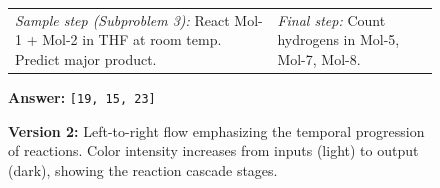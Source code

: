 \documentclass{article}
\begin{document}
\begin{figure}[t]
\begin{tcolorbox}
    \vspace{0.1cm}
    \begin{tabular}{@{}p{}p{}@{}}
    \textit{Sample step (Subproblem 3):} React Mol-1 + Mol-2 in THF at room temp. Predict major product. &
    \textit{Final step:} Count hydrogens in Mol-5, Mol-7, Mol-8. \\
    \end{tabular}

    \vspace{0.25cm}
    \hfill \textbf{Answer:} \texttt{[19, 15, 23]}
    \end{tcolorbox}

    \caption{\textbf{Version 2:} Left-to-right flow emphasizing the temporal progression of reactions. Color intensity increases from inputs (light) to output (dark), showing the reaction cascade stages.}
\end{figure}
\end{document}
